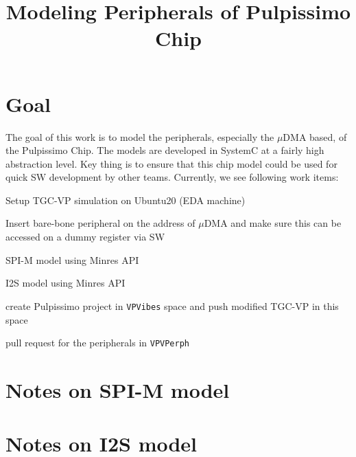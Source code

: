 \documentclass{article}
\title{Modeling Peripherals of Pulpissimo Chip}
\newcommand{\cmark}{\ding{51}}%
\newcommand{\done}{\rlap{$\square$}{\raisebox{2pt}{\large\hspace{1pt}\cmark}}%
\hspace{-2.5pt}}
\begin{document}
\maketitle

\section{Goal}
The goal of this work is to model the peripherals, especially the $\mu$DMA based, of the Pulpissimo Chip.
The models are developed in SystemC at a fairly high abstraction level. Key thing is to ensure that this
chip model could be used for quick SW development by other teams. Currently, we see following work items:

\begin{todolist}
 \item Setup TGC-VP simulation on Ubuntu20 (EDA machine)
 \item Insert bare-bone peripheral on the address of $\mu$DMA and make sure this can be accessed on a dummy register
 via SW
 \item SPI-M model using Minres API
 \item I2S model using Minres API
 \item create Pulpissimo project in \texttt{VPVibes} space and push modified TGC-VP in this space
 \item pull request for the peripherals in \texttt{VPVPerph}
\end{todolist}

\section{Notes on SPI-M model}

\section{Notes on I2S model}
\end{document}
